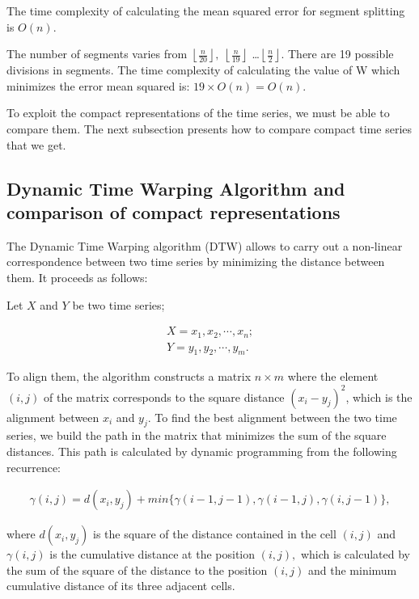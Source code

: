 The time complexity of calculating the mean squared error for segment splitting is
$ O(n). $


The number of segments varies from $ \left \lfloor \frac{n}{20} \right \rfloor, \; \left \lfloor \frac{n}{19} \right \rfloor $ \ldots $ \left \lfloor \frac{n}{2} \right \rfloor $. There are 19 possible divisions in segments. The time complexity of calculating the value of W which minimizes the error
mean squared is: $ 19 \times O(n) = O(n) $.


To exploit the compact representations of the time series, we must be able to compare them. The next subsection presents how to compare compact time series that we get.

\subsection{Dynamic Time Warping Algorithm and comparison of compact representations}

The Dynamic Time Warping algorithm (DTW)\cite{Keogh2004} allows to carry out a non-linear correspondence between two time series by minimizing the distance between them. It proceeds as follows:


Let $X$ and $Y$ be two time series;

\begin{eqnarray}
X=x_{1},x_{2},\cdots,x_{n};\\
Y=y_{1},y_{2},\cdots,y_{m}.
\end{eqnarray}


 To align them, the algorithm constructs a matrix $ n \times m $ where
the element $ (i, j) $ of the matrix corresponds to the square distance $ (x_{i} - y_{j}) ^ {2} $, which
is the alignment between $ x_{i} $ and $ y_{j} $. To find the best alignment between the two time series, we build
the path in the matrix that minimizes the sum of the square distances. This path is calculated by
dynamic programming from the following recurrence:

\begin{eqnarray}
\gamma(i, j) = d (x_{i}, y_{j}) + min \{\gamma(i-1, j-1), \gamma(i-1, j), \gamma(i , j-1) \},
\end{eqnarray}

where $ d(x_{i}, y_{j}) $ is the square of the distance contained in the cell $ (i, j) $ and $ \gamma(i, j) $ is the
cumulative distance at the position $ (i, j), $ which is calculated by the sum of the square of the distance to
the position $ (i, j) $ and the minimum cumulative distance of its three adjacent cells.


